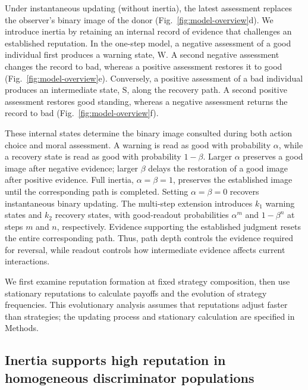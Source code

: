 \documentclass[fleqn,10pt]{wlscirep}
\begin{document}
Under instantaneous updating (without inertia), the latest assessment replaces the observer's binary image of the donor (Fig.~\ref{fig:model-overview}d). We introduce inertia by retaining an internal record of evidence that challenges an established reputation. In the one-step model, a negative assessment of a good individual first produces a warning state, $\mathrm W$. A second negative assessment changes the record to bad, whereas a positive assessment restores it to good (Fig.~\ref{fig:model-overview}e). Conversely, a positive assessment of a bad individual produces an intermediate state, $\mathrm S$, along the recovery path. A second positive assessment restores good standing, whereas a negative assessment returns the record to bad (Fig.~\ref{fig:model-overview}f).

These internal states determine the binary image consulted during both action choice and moral assessment. A warning is read as good with probability $\alpha$, while a recovery state is read as good with probability $1-\beta$. Larger $\alpha$ preserves a good image after negative evidence; larger $\beta$ delays the restoration of a good image after positive evidence. Full inertia, $\alpha=\beta=1$, preserves the established image until the corresponding path is completed. Setting $\alpha=\beta=0$ recovers instantaneous binary updating. The multi-step extension introduces $k_1$ warning states and $k_2$ recovery states, with good-readout probabilities $\alpha^m$ and $1-\beta^n$ at steps $m$ and $n$, respectively. Evidence supporting the established judgment resets the entire corresponding path. Thus, path depth controls the evidence required for reversal, while readout controls how intermediate evidence affects current interactions.

We first examine reputation formation at fixed strategy composition, then use stationary reputations to calculate payoffs and the evolution of strategy frequencies. This evolutionary analysis assumes that reputations adjust faster than strategies; the updating process and stationary calculation are specified in Methods.


\subsection*{Inertia supports high reputation in homogeneous discriminator populations}
\label{sec:results-all-disc-reputation}
\end{document}

